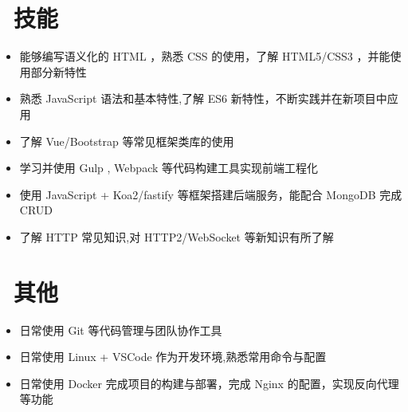 \documentclass{resume}
\begin{document}


\section{\faCogs\ 技能}
\begin{itemize}[parsep=0.5ex]
  \item 能够编写语义化的 HTML ，熟悉 CSS 的使用，了解 HTML5/CSS3 ，并能使用部分新特性
  \item 熟悉 JavaScript 语法和基本特性,了解 ES6 新特性，不断实践并在新项目中应用
  \item 了解 Vue/Bootstrap 等常见框架类库的使用
  \item 学习并使用 Gulp , Webpack 等代码构建工具实现前端工程化
  \item 使用 JavaScript + Koa2/fastify 等框架搭建后端服务，能配合 MongoDB 完成 CRUD
  \item 了解 HTTP 常见知识,对 HTTP2/WebSocket 等新知识有所了解
\end{itemize}


\section{\faInfo\ 其他}
\begin{itemize}[parsep=0.5ex]
  \item 日常使用 Git 等代码管理与团队协作工具
  \item 日常使用 Linux + VSCode 作为开发环境,熟悉常用命令与配置
  \item 日常使用 Docker 完成项目的构建与部署，完成 Nginx 的配置，实现反向代理等功能
\end{itemize}

%
%
\end{document}
